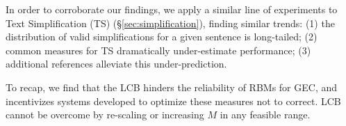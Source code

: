 \documentclass[a4paper]{article}
\newcommand{\lc}[1]{\footnote{\color{blue}LC: #1}}
\begin{document}
  In order to corroborate our findings, we apply a 
  similar line of experiments to Text Simplification (TS) (\S\ref{sec:simplification}),
  finding similar trends: (1) the distribution of valid simplifications for a given sentence is long-tailed; 
  (2) common measures for TS dramatically under-estimate performance; 
  (3) additional references alleviate this under-prediction.

  To recap, we find that the LCB hinders the reliability of RBMs for GEC,
  and incentivizes systems developed to optimize these measures not to correct. 
	LCB cannot be overcome by re-scaling or increasing $M$ in any feasible range. 
  

  
  
	
	

\end{document}
